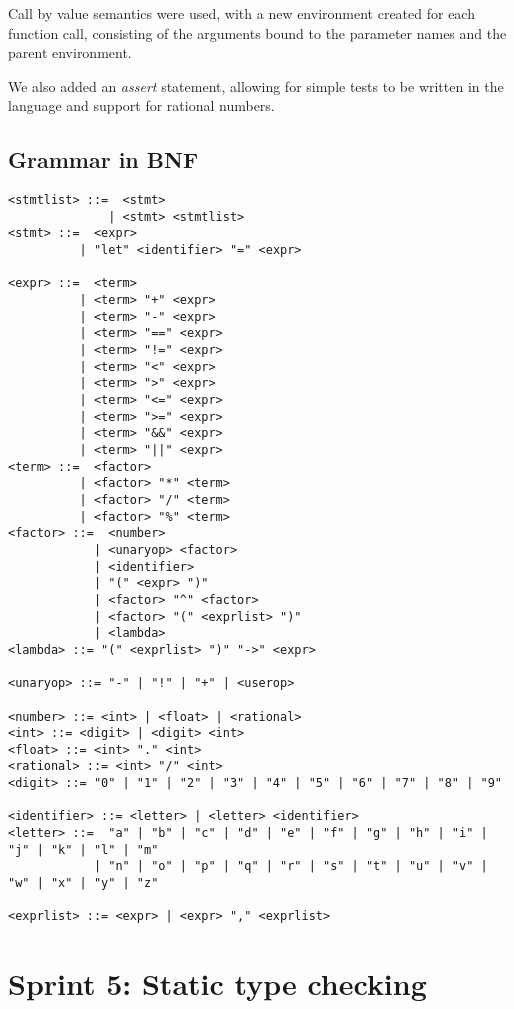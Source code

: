 Call by value semantics were used, with a new environment created for each function call, consisting of the arguments
bound to the parameter names and the parent environment.

We also added an \textit{assert} statement, allowing for simple tests to be written in the language and support for 
rational numbers.

\subsection{Grammar in BNF}\label{subsec:grammar-in-bnf4}

\begin{verbatim}
<stmtlist> ::=  <stmt> 
              | <stmt> <stmtlist>
<stmt> ::=  <expr> 
          | "let" <identifier> "=" <expr>

<expr> ::=  <term> 
          | <term> "+" <expr> 
          | <term> "-" <expr>
          | <term> "==" <expr>
          | <term> "!=" <expr>
          | <term> "<" <expr>
          | <term> ">" <expr>
          | <term> "<=" <expr>
          | <term> ">=" <expr>
          | <term> "&&" <expr>
          | <term> "||" <expr>
<term> ::=  <factor> 
          | <factor> "*" <term> 
          | <factor> "/" <term> 
          | <factor> "%" <term> 
<factor> ::=  <number> 
            | <unaryop> <factor>
            | <identifier> 
            | "(" <expr> ")" 
            | <factor> "^" <factor>
            | <factor> "(" <exprlist> ")"
            | <lambda>
<lambda> ::= "(" <exprlist> ")" "->" <expr>

<unaryop> ::= "-" | "!" | "+" | <userop>
            
<number> ::= <int> | <float> | <rational>
<int> ::= <digit> | <digit> <int>
<float> ::= <int> "." <int>
<rational> ::= <int> "/" <int>
<digit> ::= "0" | "1" | "2" | "3" | "4" | "5" | "6" | "7" | "8" | "9"

<identifier> ::= <letter> | <letter> <identifier>
<letter> ::=  "a" | "b" | "c" | "d" | "e" | "f" | "g" | "h" | "i" | "j" | "k" | "l" | "m" 
            | "n" | "o" | "p" | "q" | "r" | "s" | "t" | "u" | "v" | "w" | "x" | "y" | "z"
            
<exprlist> ::= <expr> | <expr> "," <exprlist>

\end{verbatim}

\section{Sprint 5: Static type checking}\label{sec:static-type-checking}


